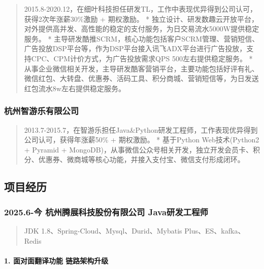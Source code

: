 \begin{quote}
2015.8-2020.12，在细叶科技担任研发TL，工作中表现优异得到公司认可，获得2次年涨薪30\%激励
+ 期权激励。 *
独立设计、研发数趣云开放平台，对外提供高并发、高性能的稳定的支付服务，为日交易流水5000W提供稳定服务。
*
主导研发酷推SCRM，核心功能包括客户SCRM管理、营销短信、广告投放DSP平台等，作为DSP平台接入讯飞ADX平台进行广告投放，支持CPC、CPM计价方式，为广告投放需求QPS
500左右提供稳定服务。 *
从事企业微信相关开发，主导研发酷客营销平台，主要功能包括好评有礼、微信红包、大转盘、优惠券、活码工具、积分商城、营销短信等，为日发送红包流水8w左右提供稳定服务。
\end{quote}

\subsubsection{杭州智游乐有限公司}\label{ux676dux5ddeux667aux6e38ux4e50ux6709ux9650ux516cux53f8}

\begin{quote}
2013.7-2015.7，在智游乐担任Java\&Python研发工程师，工作表现优异得到公司认可，获得年涨薪50\%
+ 期权激励。 * 基于Python Web技术(Python2 + Pyramid +
MongoDB)，从事微信公众号相关开发，独立开发会员卡、积分、优惠券、微商城等核心功能，并接入支付宝、微信支付形成闭环。
\end{quote}

\subsection{项目经历}\label{ux9879ux76eeux7ecfux5386}

\subsubsection{2025.6-今 \textbar{} 杭州腾展科技股份有限公司 \textbar{}
Java研发工程师}\label{ux4eca-ux676dux5ddeux817eux5c55ux79d1ux6280ux80a1ux4efdux6709ux9650ux516cux53f8-javaux7814ux53d1ux5de5ux7a0bux5e08}

\begin{quote}
JDK 1.8、Spring-Cloud、Mysql、Durid、Mybatis Plus、ES、kafka、Redis
\end{quote}

\paragraph{1. 面对面翻译功能
链路架构升级}\label{ux9762ux5bf9ux9762ux7ffbux8bd1ux529fux80fd-ux94feux8defux67b6ux6784ux5347ux7ea7}


